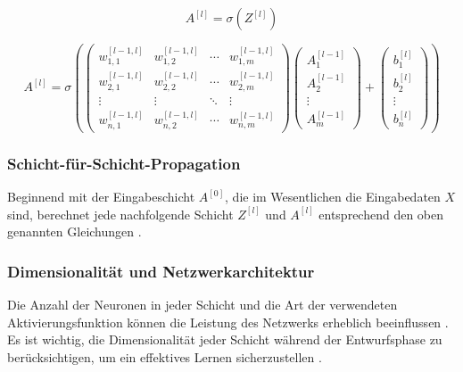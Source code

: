 \begin{equation}
A^{[l]} = \sigma(Z^{[l]})
\end{equation}

\begin{equation}
A^{[l]} = \sigma \left( 
\begin{pmatrix}
w_{1,1}^{[l-1,l]} & w_{1,2}^{[l-1,l]} & \cdots & w_{1,m}^{[l-1,l]} \\
w_{2,1}^{[l-1,l]} & w_{2,2}^{[l-1,l]} & \cdots & w_{2,m}^{[l-1,l]} \\
\vdots & \vdots & \ddots & \vdots \\
w_{n,1}^{[l-1,l]} & w_{n,2}^{[l-1,l]} & \cdots & w_{n,m}^{[l-1,l]}
\end{pmatrix}
\begin{pmatrix}
A_1^{[l-1]} \\
A_2^{[l-1]} \\
\vdots \\
A_m^{[l-1]}
\end{pmatrix}
+
\begin{pmatrix}
b_1^{[l]} \\
b_2^{[l]} \\
\vdots \\
b_n^{[l]}
\end{pmatrix}
\right)
\end{equation}

\subsubsection{Schicht-für-Schicht-Propagation}
Beginnend mit der Eingabeschicht \( A^{[0]} \), die im Wesentlichen die Eingabedaten \( X \) sind, berechnet jede nachfolgende Schicht \( Z^{[l]} \) und \( A^{[l]} \) entsprechend den oben genannten Gleichungen \cite[p.~1421]{russell2021ai}.

\subsubsection{Dimensionalität und Netzwerkarchitektur}
Die Anzahl der Neuronen in jeder Schicht und die Art der verwendeten Aktivierungsfunktion können die Leistung des Netzwerks erheblich beeinflussen \cite[p.~1408]{russell2021ai}. Es ist wichtig, die Dimensionalität jeder Schicht während der Entwurfsphase zu berücksichtigen, um ein effektives Lernen sicherzustellen \cite[p.~73]{Chollet2021}.
